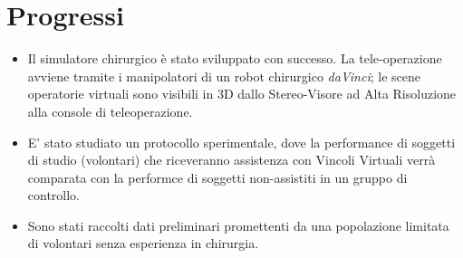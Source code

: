 \documentclass{article}
\begin{document}
\section{Progressi}
\begin{itemize}
  \item Il simulatore chirurgico è stato sviluppato con successo. La tele-operazione avviene tramite i manipolatori di un robot chirurgico \textit{daVinci}; le scene operatorie virtuali sono visibili in 3D dallo Stereo-Visore ad Alta Risoluzione alla console di teleoperazione.
  \item E' stato studiato un protocollo sperimentale, dove la performance di soggetti di studio (volontari) che riceveranno assistenza con Vincoli Virtuali verrà comparata con la performce di soggetti non-assistiti in un gruppo di controllo.
  \item Sono stati raccolti dati preliminari promettenti da una popolazione limitata di volontari senza esperienza in chirurgia.  
\end{itemize}
\end{document}
